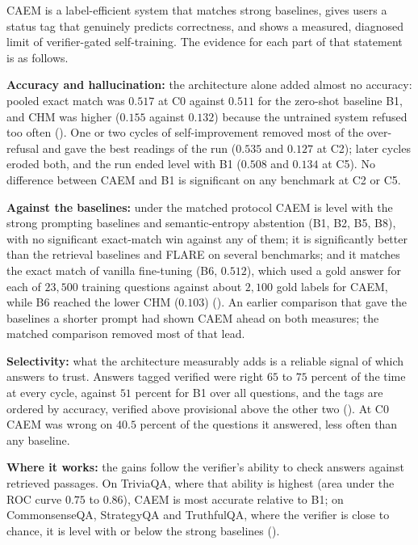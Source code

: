 CAEM is a label-efficient system that matches strong baselines, gives users a status tag that genuinely predicts correctness, and shows a measured, diagnosed limit of verifier-gated self-training. The evidence for each part of that statement is as follows.

\textbf{Accuracy and hallucination:} the architecture alone added almost no accuracy: pooled exact match was $0.517$ at C0 against $0.511$ for the zero-shot baseline B1, and CHM was higher ($0.155$ against $0.132$) because the untrained system refused too often (). One or two cycles of self-improvement removed most of the over-refusal and gave the best readings of the run ($0.535$ and $0.127$ at C2); later cycles eroded both, and the run ended level with B1 ($0.508$ and $0.134$ at C5). No difference between CAEM and B1 is significant on any benchmark at C2 or C5.

\textbf{Against the baselines:} under the matched protocol CAEM is level with the strong prompting baselines and semantic-entropy abstention (B1, B2, B5, B8), with no significant exact-match win against any of them; it is significantly better than the retrieval baselines and FLARE on several benchmarks; and it matches the exact match of vanilla fine-tuning (B6, $0.512$), which used a gold answer for each of $23{,}500$ training questions against about $2{,}100$ gold labels for CAEM, while B6 reached the lower CHM ($0.103$) (). An earlier comparison that gave the baselines a shorter prompt had shown CAEM ahead on both measures; the matched comparison removed most of that lead.

\textbf{Selectivity:} what the architecture measurably adds is a reliable signal of which answers to trust. Answers tagged verified were right $65$ to $75$ percent of the time at every cycle, against $51$ percent for B1 over all questions, and the tags are ordered by accuracy, verified above provisional above the other two (). At C0 CAEM was wrong on $40.5$ percent of the questions it answered, less often than any baseline.

\textbf{Where it works:} the gains follow the verifier's ability to check answers against retrieved passages. On TriviaQA, where that ability is highest (area under the ROC curve $0.75$ to $0.86$), CAEM is most accurate relative to B1; on CommonsenseQA, StrategyQA and TruthfulQA, where the verifier is close to chance, it is level with or below the strong baselines ().

